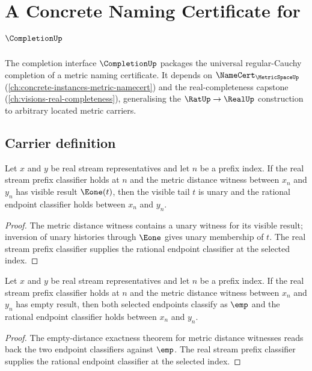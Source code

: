 \chapter{A Concrete Naming Certificate for $\CompletionUp$}
\label{ch:concrete-instances-completion-namecert}

The completion interface $\CompletionUp$ packages the universal regular-Cauchy completion of a metric naming certificate. It depends on $\NameCert_{\MetricSpaceUp}$ (\autoref{ch:concrete-instances-metric-namecert}) and the real-completeness capstone (\autoref{ch:visions-real-completeness}), generalising the $\RatUp \to \RealUp$ construction to arbitrary located metric carriers.

\section{Carrier definition}
\label{sec:completion-carrier}

\begin{theorem}\label{thm:completion-metric-distance-e1-tail-real-prefix-readback}
Let $x$ and $y$ be real stream representatives and let $n$ be a prefix index. If the
real stream prefix classifier holds at $n$ and the metric distance witness between
$x_n$ and $y_n$ has visible result $\Eone(t)$, then the visible tail $t$ is unary and
the rational endpoint classifier holds between $x_n$ and $y_n$.
\end{theorem}
\begin{proof}
The metric distance witness contains a unary witness for its visible result; inversion
of unary histories through $\Eone$ gives unary membership of $t$. The real stream
prefix classifier supplies the rational endpoint classifier at the selected index.
\end{proof}

\begin{theorem}
\label{thm:completion-empty-distance-real-prefix-readback}
Let $x$ and $y$ be real stream representatives and let $n$ be a prefix index. If the
real stream prefix classifier holds at $n$ and the metric distance witness between
$x_n$ and $y_n$ has empty result, then both selected endpoints classify as $\emp$
and the rational endpoint classifier holds between $x_n$ and $y_n$.
\end{theorem}
\begin{proof}
The empty-distance exactness theorem for metric distance witnesses reads back
the two endpoint classifiers against $\emp$. The real stream prefix classifier
supplies the rational endpoint classifier at the selected index.
\end{proof}

